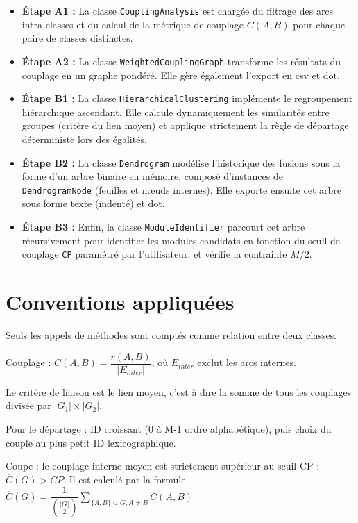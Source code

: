\documentclass{Templates/customArticle}
\begin{document}
\begin{itemize}
	\itemsep0.2em
    \item \textbf{Étape A1 :} La classe \texttt{CouplingAnalysis} est chargée du filtrage des arcs intra-classes et du calcul de la métrique de couplage $C(A, B)$ pour chaque paire de classes distinctes.
    
    \item \textbf{Étape A2 :} La classe \texttt{WeightedCouplingGraph} transforme les résultats du couplage en un graphe pondéré. Elle gère également l'export en csv et dot.
    
    \item \textbf{Étape B1 :} La classe \texttt{HierarchicalClustering} implémente le regroupement hiérarchique ascendant. Elle calcule dynamiquement les similarités entre groupes (critère du lien moyen) et applique strictement la règle de départage déterministe lors des égalités.
    
    \item \textbf{Étape B2 :} La classe \texttt{Dendrogram} modélise l'historique des fusions sous la forme d'un arbre binaire en mémoire, composé d'instances de \texttt{DendrogramNode} (feuilles et nœuds internes). Elle exporte ensuite cet arbre sous forme texte (indenté) et dot.
    
    \item \textbf{Étape B3 :} Enfin, la classe \texttt{ModuleIdentifier} parcourt cet arbre récursivement pour identifier les modules candidats en fonction du seuil de couplage \texttt{CP} paramétré par l'utilisateur, et vérifie la contrainte $M/2$.
\end{itemize}

\section{Conventions appliquées}\label{Conventions}

Seuls les appels de méthodes sont comptés comme relation entre deux classes.

Couplage : $C(A, B) = \dfrac{r(A, B)}{|E_{inter}|}$, où $E_{inter}$ exclut les arcs internes.

Le critère de liaison est le lien moyen, c'est à dire la somme de tous les couplages divisée par $|G_1| \times |G_2|$.

Pour le départage : ID croissant (0 à M-1 ordre alphabétique), puis choix du couple au plus petit ID lexicographique.

Coupe : le couplage interne moyen est strictement supérieur au seuil CP : $\overline{C}(G) > CP$.
Il est calculé par la formule $\overline{C}(G) = \dfrac{1}{\binom{|G|}{2}}\sum\limits_{\{A,B\}\subseteq G, A\neq B} C(A,B)$
\end{document}
